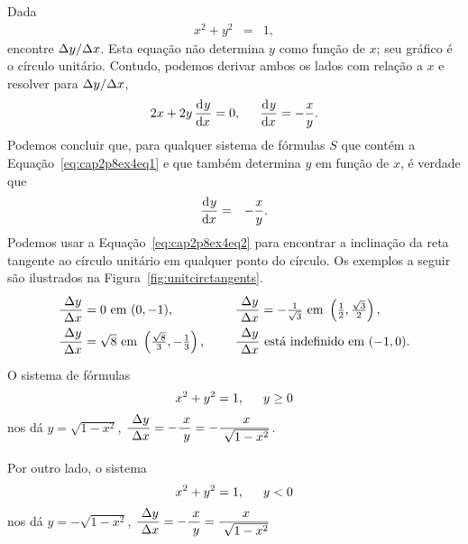\begin{example}
Dada
\begin{eqnarray}
  x^2 + y^2 & = & 1, \label{eq:cap2p8ex4eq1}
\end{eqnarray}
encontre $\Delta{y}/\Delta{x}$. Esta equação não determina $y$ como função de $x$; seu
gráfico é o círculo unitário. Contudo, podemos derivar ambos os lados com
relação a $x$ e resolver para $\Delta{y}/\Delta{x}$,
$$
  2x + 2y \dod y x = 0, \hspace{1.5em} \dod y x = -\frac{x}{y}.
$$
Podemos concluir que, para qualquer sistema de fórmulas $S$ que contém a
Equação~\ref{eq:cap2p8ex4eq1} e que também determina $y$ em função de $x$,
é verdade que
\begin{eqnarray}
  \dod y x & = & -\frac{x}{y}. \label{eq:cap2p8ex4eq2}
\end{eqnarray}
Podemos usar a Equação~\ref{eq:cap2p8ex4eq2} para encontrar a inclinação da
reta tangente ao círculo unitário em qualquer ponto do círculo. Os exemplos
a seguir são ilustrados na Figura~\ref{fig:unitcirctangents}.
$$
\begin{array}{l<{\hspace{1.5em}}l}
  \dsfrac{\dy}{\dx} = 0 \text{ em } (0, -1), &
    \dsfrac{\dy}{\dx} = -\frac{1}{\sqrt{3}} \text{ em } \left(\frac{1}{2}, \frac{\sqrt{3}}{2}\right), \\
  \dsfrac{\dy}{\dx} = \sqrt{8} \text{ em } \left(\frac{\sqrt{8}}{3}, -\frac{1}{3}\right),
  & \dsfrac{\dy}{\dx} \text{ está indefinido em } (-1, 0).
\end{array}
$$
O sistema de fórmulas
$$
  x^2 + y^2 = 1, \hspace{1.5em} y \ge 0
$$
nos dá \hspace{1.5em} $y = \sqrt{1 - x^2}$, \hspace{1.5em}
$\dsfrac{\dy}{\dx} = -\dsfrac{x}{y} = -\dsfrac{x}{\sqrt{1-x^2}}$.

Por outro lado, o sistema
$$
  x^2 + y^2 = 1, \hspace{1.5em} y < 0
$$
nos dá \hspace{1.5em} $y = -\sqrt{1 - x^2}$, \hspace{1.5em}
$\dsfrac{\dy}{\dx} = -\dsfrac{x}{y} = \dsfrac{x}{\sqrt{1-x^2}}$
\end{example}

